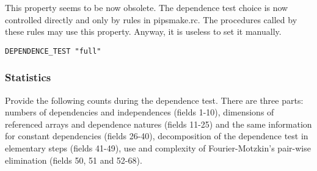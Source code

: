 This property seems to be now obsolete. The dependence test choice is
now controlled directly and only by rules in pipsmake.rc. The procedures
called by these rules may use this property. Anyway, it is useless to
set it manually.

\begin{verbatim}
DEPENDENCE_TEST "full"
\end{verbatim}


\subsubsection{Statistics}

Provide the following counts during the dependence test. There are three
parts: numbers of dependencies and independences (fields 1-10),
dimensions of referenced arrays and dependence natures (fields 11-25)
and the same information for constant dependencies (fields 26-40),
decomposition of the dependence test in elementary steps (fields 41-49),
use and complexity of Fourier-Motzkin's pair-wise elimination (fields
50, 51 and 52-68).

